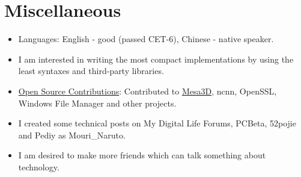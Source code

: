 \documentclass{resume}
\begin{document}
\section{Miscellaneous}
\begin{itemize}

  \item Languages: English - good (passed CET-6),  Chinese - native speaker.

  \item I am interested in writing the most compact implementations by using the least syntaxes and third-party libraries.

  \item \href{https://github.com/search?q=is%3Apr%20author%3AMouriNaruto&type=pullrequests}{Open Source Contributions}: Contributed to \href{https://gitlab.freedesktop.org/mesa/mesa/-/merge_requests/22961}{Mesa3D}, ncnn, OpenSSL, Windows File Manager and other projects.
  
  \item I created some technical posts on My Digital Life Forums, PCBeta, 52pojie and Pediy as Mouri\_Naruto.
  
  \item I am desired to make more friends which can talk something about technology.
  
\end{itemize}
\end{document}
